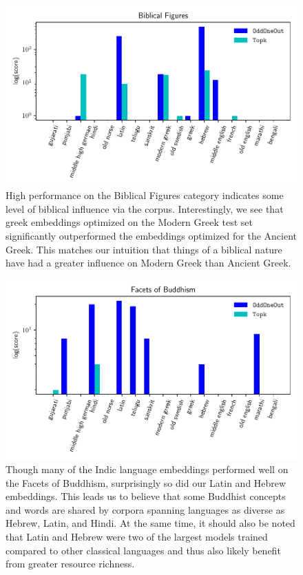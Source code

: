 \documentclass[11pt,a4paper]{article}
\begin{document}
\begin{figure}
\centering
\includegraphics{biblical-raw.pdf} 
\caption{High performance on the Biblical Figures category indicates some level of biblical influence via the corpus. 
Interestingly, we see that greek embeddings optimized on the Modern Greek test set significantly outperformed the embeddings optimized for the Ancient Greek. 
This matches our intuition that things of a biblical nature have had a greater influence on Modern Greek than Ancient Greek.}
\label{fig:biblicall}
\end{figure}

\begin{figure}
\centering
\includegraphics{buddhism-raw.pdf} 
\caption{Though many of the Indic language embeddings performed well on the Facets of Buddhism, 
surprisingly so did our Latin and Hebrew embeddings. 
This leads us to believe that some Buddhist concepts and words are shared by corpora spanning languages as diverse as Hebrew, Latin, and Hindi. 
At the same time, it should also be noted that Latin and Hebrew were two of the largest models trained compared to other classical languages and thus also likely benefit from greater resource richness.}
\label{fig:buddhism}
\end{figure}
\end{document}

